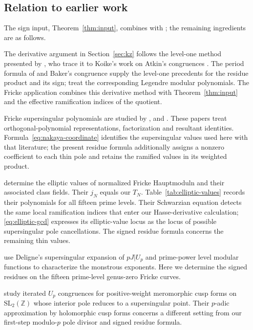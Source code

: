 \documentclass[11pt,a4paper]{article}
\numberwithin{equation}{section}
\theoremstyle{definition}
\theoremstyle{remark}
\newcommand{\Z}{\mathbb Z}
\begin{document}
\subsection{Relation to earlier work}
The sign input, Theorem~\ref{thm:input}, combines \citet{Baker98} with
\citet{JordanFactorial}; the remaining ingredients are as follows.

The derivative argument in Section~\ref{sec:kz} follows the level-one
method presented by \citet[\S10]{KZ98}, who trace it to Koike's work
on Atkin's congruences \citep{Koike73}. The period formula of
\citet{dS94} and Baker's congruence supply the level-one precedents
for the residue product and its sign; \citet{BL18} treat the
corresponding Legendre modular polynomials. The Fricke application
combines this derivative method with Theorem~\ref{thm:input} and
the effective ramification indices of the quotient.

Fricke supersingular polynomials are studied by \citet{Sakai11,Sakai14},
\citet{Nakaya19} and \citet{Morton23}. These papers treat
orthogonal-polynomial representations, factorization and resultant
identities. Formula~\eqref{eq:nakaya-coordinate} identifies the supersingular
values used here with that literature; the present residue formula additionally
assigns a nonzero coefficient to each thin pole and retains the ramified values
in its weighted product.

\citet[\S4.2, Table~1 and Appendix~C]{JST19} determine the elliptic values
of normalized Fricke Hauptmoduln and their associated class fields. Their
$j_N$ equals our $T_N$. Table~\ref{tab:elliptic-values} records their
polynomials for all fifteen prime levels. Their Schwarzian equation
detects the same local ramification indices that enter our Hasse-derivative
calculation; \eqref{eq:elliptic-gcd} expresses its elliptic-value locus as
the locus of possible supersingular pole cancellations. The signed residue
formula concerns the remaining thin values.

\citet[Proposition~3.1 and \S4]{DS26} use Deligne's supersingular
expansion of $pJ|U_p$ and prime-power level modular functions to
characterize the monstrous exponents. Here we determine the signed
residues on the fifteen prime-level genus-zero Fricke curves.

\citet[Theorem~1.1]{BGKMR26} study iterated $U_p$ congruences for
positive-weight meromorphic cusp forms on $\mathrm{SL}_2(\Z)$ whose
interior pole reduces to a supersingular point. Their $p$-adic
approximation by holomorphic cusp forms concerns a different setting
from our first-step modulo-$p$ pole divisor and signed residue formula.
\end{document}
